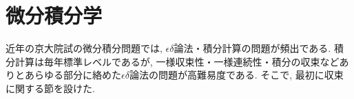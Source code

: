 \chapter{微分積分学}


近年の京大院試の微分積分問題では, $\epsilon\delta$論法・積分計算の問題が頻出である. 積分計算は毎年標準レベルであるが, 一様収束性・一様連続性・積分の収束などありとあらゆる部分に絡めた$\epsilon\delta$論法の問題が高難易度である. そこで, 最初に収束に関する節を設けた.
